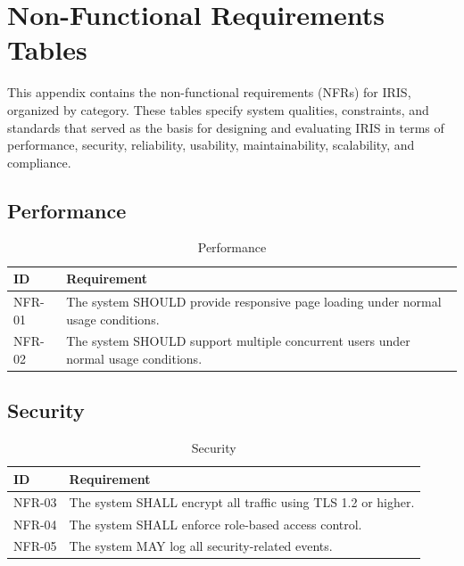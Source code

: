 \chapter{Non-Functional Requirements Tables}
\label{sec:appendixb}

This appendix contains the non-functional requirements (NFRs) for IRIS, organized by category. These tables specify system qualities, constraints, and standards that served as the basis for designing and evaluating IRIS in terms of performance, security, reliability, usability, maintainability, scalability, and compliance.

\section{Performance}

\begin{table}[H]
\centering
\setlength{\tabcolsep}{6pt}
\renewcommand{\arraystretch}{1.05}
\small
\caption{Performance}
\label{tab:nfr_performance}
\begin{tabular}{|p{2.2cm}|p{12cm}|}
\hline
\textbf{ID} & \textbf{Requirement} \\
\hline
NFR-01 & The system SHOULD provide responsive page loading under normal usage conditions. \\
\hline
NFR-02 & The system SHOULD support multiple concurrent users under normal usage conditions. \\
\hline
\end{tabular}
\end{table}

\section{Security}

\begin{table}[H]
\centering
\setlength{\tabcolsep}{6pt}
\renewcommand{\arraystretch}{1.05}
\small
\caption{Security}
\begin{tabular}{|p{2.2cm}|p{12cm}|}
\hline
\textbf{ID} & \textbf{Requirement} \\
\hline
NFR-03 & The system SHALL encrypt all traffic using TLS 1.2 or higher. \\
\hline
NFR-04 & The system SHALL enforce role-based access control. \\
\hline
NFR-05 & The system MAY log all security-related events. \\
\hline
\end{tabular}
\end{table}

